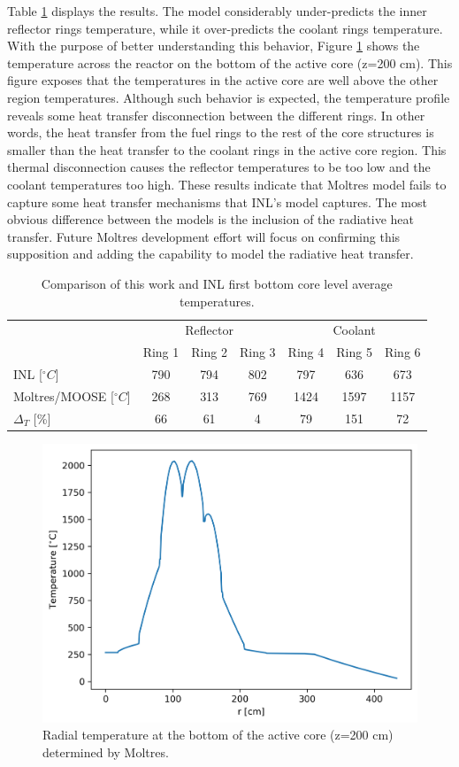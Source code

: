 Table \ref{tab:th-ex2a-1st-results} displays the results.
The model considerably under-predicts the inner reflector rings temperature, while it over-predicts the coolant rings temperature.
With the purpose of better understanding this behavior, Figure \ref{fig:ex2a-1st-model-across} shows the temperature across the reactor on the bottom of the active core (z=200 cm).
This figure exposes that the temperatures in the active core are well above the other region temperatures.
Although such behavior is expected, the temperature profile reveals some heat transfer disconnection between the different rings.
In other words, the heat transfer from the fuel rings to the rest of the core structures is smaller than the heat transfer to the coolant rings in the active core region.
This thermal disconnection causes the reflector temperatures to be too low and the coolant temperatures too high.
These results indicate that Moltres model fails to capture some heat transfer mechanisms that INL's model captures.
The most obvious difference between the models is the inclusion of the radiative heat transfer.
Future Moltres development effort will focus on confirming this supposition and adding the capability to model the radiative heat transfer.

\begin{table}[htbp!]
\centering
      \caption{Comparison of this work and INL \cite{strydom_inl_2013} first bottom core level average temperatures.}
      \label{tab:th-ex2a-1st-results}
\begin{tabular}{l|ccc|ccc}
    \toprule
                & \multicolumn{3}{c|}{Reflector} & \multicolumn{3}{c}{Coolant} \\ \cline{2-7} 
                & Ring 1   & Ring 2   & Ring 3   & Ring 4   & Ring 5  & Ring 6  \\
    \midrule
INL [$^{\circ}C$]           & 790    & 794     & 802     & 797     & 636     & 673     \\
Moltres/MOOSE [$^{\circ}C$] & 268    & 313     & 769     & 1424    & 1597    & 1157    \\
$\Delta_T$ [\%]    & 66       & 61     & 4       & 79      & 151     & 72      \\
    \bottomrule
  \end{tabular}
\end{table}

\begin{figure}[htbp!]
  \centering
  \includegraphics[width=0.45\linewidth]{figures-thermal/ex2a-across}
  \hfill
  \caption{Radial temperature at the bottom of the active core (z=200 cm) determined by Moltres.}
  \label{fig:ex2a-1st-model-across}
\end{figure}

